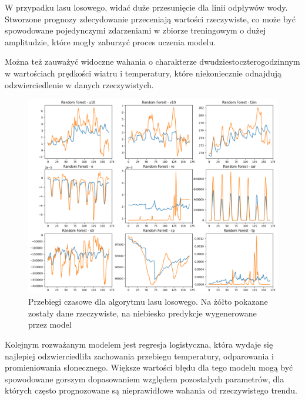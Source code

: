 W przypadku lasu losowego, widać duże przesunięcie dla linii odpływów wody. Stworzone prognozy zdecydowanie
przeceniają wartości rzeczywiste, co może być spowodowane pojedynczymi zdarzeniami w zbiorze treningowym o
dużej amplitudzie, które mogły zaburzyć proces uczenia modelu.

Można też zauważyć widoczne wahania o charakterze dwudziestoczterogodzinnym w wartościach 
prędkości wiatru i temperatury, które niekoniecznie odnajdują odzwierciedlenie w danych rzeczywistych.

\begin{figure}[H]
    \centering
    \includegraphics[width=\textwidth]{images/random_forest_week.png}
    \caption{Przebiegi czasowe dla algorytmu lasu losowego. Na żółto pokazane zostały dane 
    rzeczywiste, na niebiesko predykcje wygenerowane przez model}
    \label{forest-week}
\end{figure}

Kolejnym rozważanym modelem jest regresja logistyczna, która wydaje się najlepiej odzwierciedliła 
zachowania przebiegu temperatury, odparowania i promieniowania słonecznego. Większe wartości 
błędu dla tego modelu mogą być spowodowane gorszym dopasowaniem względem pozostałych parametrów, dla których
często prognozowane są nieprawidłowe wahania od rzeczywistego trendu.

